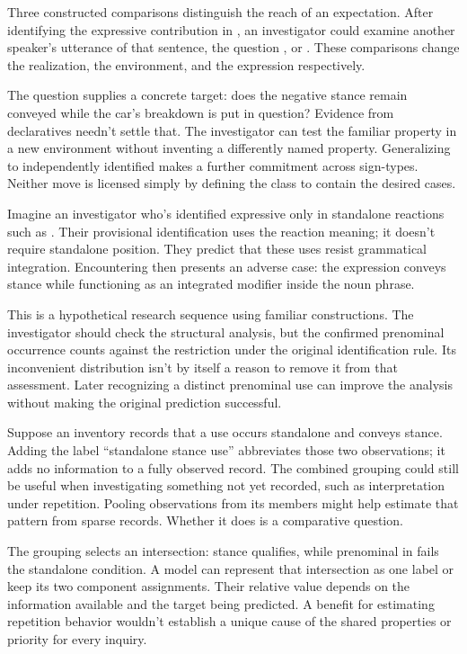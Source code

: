 Three constructed comparisons distinguish the reach of an expectation.
After identifying the expressive contribution in , an investigator could examine another speaker's utterance
of that sentence, the question ,
or . These comparisons change the
realization, the environment, and the expression respectively.

The question supplies a concrete target: does the negative stance
remain conveyed while the car's breakdown is put in question? Evidence
from declaratives needn't settle that. The investigator can test the
familiar property in a new environment without inventing a differently
named property. Generalizing to independently identified 
makes a further commitment across sign-types. Neither move is licensed
simply by defining the class to contain the desired cases.

Imagine an investigator who's identified expressive 
only in standalone reactions such as . Their provisional identification uses the reaction meaning;
it doesn't require standalone position. They predict that these uses
resist grammatical integration. Encountering  then presents an adverse case: the expression conveys stance
while functioning as an integrated modifier inside the noun phrase.

This is a hypothetical research sequence using familiar constructions.
The investigator should check the structural analysis, but the confirmed
prenominal occurrence counts against the restriction under the original
identification rule. Its inconvenient distribution isn't by itself a
reason to remove it from that assessment. Later recognizing a distinct
prenominal use can improve the analysis without making the original
prediction successful.

Suppose an inventory records that a use occurs standalone and conveys
stance. Adding the label \enquote{standalone stance use} abbreviates
those two observations; it adds no information to a fully observed
record. The combined grouping could still be useful when investigating
something not yet recorded, such as interpretation under repetition.
Pooling observations from its members might help estimate that pattern
from sparse records. Whether it does is a comparative question.

The grouping selects an intersection: stance  qualifies,
while prenominal  in  fails the
standalone condition. A model can represent that intersection as one
label or keep its two component assignments. Their relative value
depends on the information available and the target being predicted.
A benefit for estimating repetition behavior wouldn't establish a
unique cause of the shared properties or priority for every inquiry.

